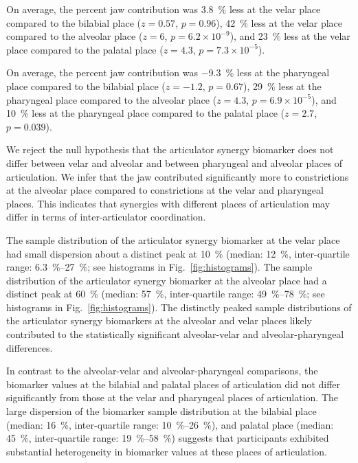 \documentclass[reprint]{JASAnew}\usepackage[]{graphicx}\usepackage[]{color}
\begin{document}
%
On average, the percent jaw contribution was 
%
%
\SI{3.8}{\percent} 
less at the velar place compared to the bilabial place
($z=0.57$, 
$p=0.96$),
%
%
\SI{42}{\percent} 
less at the velar place compared to the alveolar place
($z=6$, 
$p=\ensuremath{6.2\times 10^{-9}}$), and
%
%
\SI{23}{\percent} 
less at the velar place compared to the palatal place
($z=4.3$, 
$p=\ensuremath{7.3\times 10^{-5}}$).




%
On average, the percent jaw contribution was 
%
%
\SI{-9.3}{\percent} 
less at the pharyngeal place compared to the bilabial place
($z=-1.2$, 
$p=0.67$),
%
%
\SI{29}{\percent} 
less at the pharyngeal place compared to the alveolar place
($z=4.3$, 
$p=\ensuremath{6.9\times 10^{-5}}$), and
%
%
\SI{10}{\percent} 
less at the pharyngeal place compared to the palatal place
($z=2.7$, 
$p=0.039$).




We reject the null hypothesis that the articulator synergy biomarker does not differ between velar and alveolar and between pharyngeal and alveolar places of articulation. 
%
We infer that the jaw contributed significantly more to constrictions at the alveolar place compared to constrictions at the velar and pharyngeal places.
%
This indicates that synergies with different places of articulation may differ in terms of inter-articulator coordination.




The sample distribution of the articulator synergy biomarker at the velar place had small dispersion about a distinct peak at \SI{10}{\percent} 
%
(median: \SI{12}{\percent}, 
inter-quartile range: \SIrange{6.3}{27}{\percent}; see histograms in Fig.~\ref{fig:histograms}).
%
The sample distribution of the articulator synergy biomarker at the alveolar place had a distinct peak at \SI{60}{\percent}
%
(median: \SI{57}{\percent}, 
inter-quartile range: \SIrange{49}{78}{\percent}; see histograms in Fig.~\ref{fig:histograms}).
%
The distinctly peaked sample distributions of the articulator synergy biomarkers at the alveolar and velar places likely contributed to the statistically significant alveolar-velar and alveolar-pharyngeal differences.



In contrast to the alveolar-velar and alveolar-pharyngeal comparisons, the biomarker values at the bilabial and palatal places of articulation did not differ significantly from those at the velar and pharyngeal places of articulation. 
%
The large dispersion of the biomarker sample distribution at the bilabial place
%
(median: \SI{16}{\percent}, 
inter-quartile range: \SIrange{10}{26}{\percent}), 
%
and palatal place
%
(median: \SI{45}{\percent}, 
inter-quartile range: \SIrange{19}{58}{\percent})
%
suggests that participants exhibited substantial heterogeneity in biomarker values at these places of articulation.  







\end{document}
